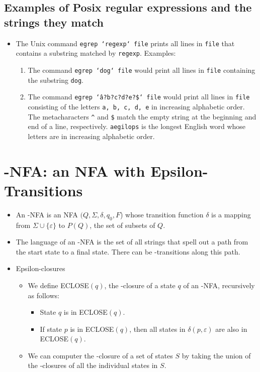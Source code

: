 \documentclass[]{article}
\begin{document}
  \subsection*{Examples of Posix regular expressions and the strings they match}
    \begin{itemize}
      \item The Unix command \texttt{egrep `regexp` file} prints all lines in
            \texttt{file} that contains a substring matched by \texttt{regexp}.
            Examples:
        \begin{enumerate}
          \item The command \texttt{egrep `dog` file} would print all lines in
                \texttt{file} containing the substring \texttt{dog}.
          \item The command \texttt{egrep `\^a?b?c?d?e?\$` file} would print all
                lines in \texttt{file} consisting of the letters \texttt{a, b,
                c, d, e} in increasing alphabetic order. The metacharacters
                \texttt{\^} and \texttt{\$} match the empty string at the
                beginning and end of a line, respectively. \texttt{aegilops} is
                the longest English word whose letters are in increasing
                alphabetic order.
        \end{enumerate}
    \end{itemize}

\section{\textepsilon-NFA: an NFA with Epsilon-Transitions}
  \begin{itemize}
    \item An \textepsilon-NFA is an NFA $(Q, \Sigma, \delta, q_0, F$) whose
          transition function $\delta$ is a mapping from $\Sigma \cup \{
          \varepsilon \}$ to $P(Q)$, the set of subsets of $Q$.
    \item The language of an \textepsilon-NFA is the set of all strings that
          spell out a path from the start state to a final state. There can be
          \textepsilon-transitions along this path.
    \item Epsilon-closures
      \begin{itemize}
        \item We define ECLOSE$(q)$, the \textepsilon-closure of a state $q$ of
              an \textepsilon-NFA, recursively as follows:
          \begin{itemize}
            \item State $q$ is in ECLOSE$(q)$.
            \item If state $p$ is in ECLOSE$(q)$, then all states in $\delta
                  (p, \varepsilon)$ are also in ECLOSE$(q)$.
          \end{itemize}
        \item We can computer the \textepsilon-closure of a set of states $S$ by
              taking the union of the \textepsilon-closures of all the
              individual states in $S$.
      \end{itemize}
  \end{itemize}
\end{document}
